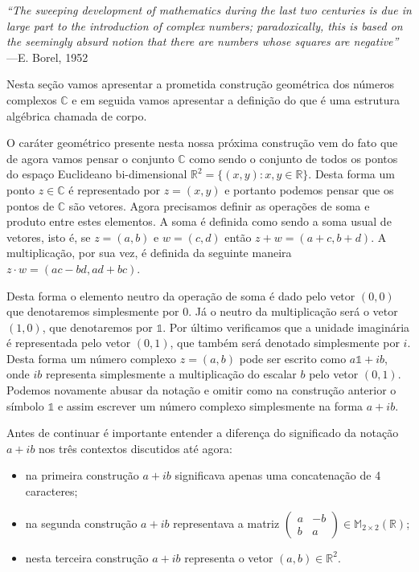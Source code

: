 \vspace{0.5cm}
\hfill%
\begin{minipage}{10cm}
\begin{flushright}
\rightskip=0.5cm
\textit{``The sweeping development of mathematics during the last two centuries is
due in large part to the introduction of complex numbers; paradoxically, this is based
on the seemingly absurd notion that there are numbers whose squares are negative''}
\\[0.1cm]
\rightskip=0.5cm
---E. Borel, 1952
\end{flushright}
\end{minipage}
\vspace{1cm}


Nesta seção vamos apresentar a prometida construção geométrica dos números complexos $\mathbb{C}$
e em seguida vamos apresentar a definição do que é uma estrutura algébrica chamada de corpo.

O caráter geométrico presente nesta nossa próxima construção vem do 
fato que de agora vamos pensar o conjunto $\mathbb{C}$ como sendo o conjunto de todos
os pontos do espaço Euclideano bi-dimensional $\mathbb{R}^2 = \{(x,y) : x,y\in \mathbb{R}\}$.
Desta forma um ponto $z\in\mathbb{C}$ é representado por $z=(x,y)$ e portanto podemos
pensar que os pontos de $\mathbb{C}$ são vetores. 
Agora precisamos definir as operações de soma e produto entre estes elementos. 
A soma é definida como sendo a soma usual de vetores, isto é, se $z=(a,b)$ e $w=(c,d)$
então $z+w=(a+c,b+d)$. A multiplicação, por sua vez, é definida da seguinte maneira 
$z\cdot w = (ac-bd,ad+bc)$. 

Desta forma o elemento neutro da operação de soma é dado pelo vetor 
$(0,0)$ que denotaremos simplesmente por $0$. 
Já o  neutro da multiplicação será o vetor $(1,0)$, que denotaremos por $\mathds{1}$. 
Por último verificamos que a unidade imaginária é representada pelo vetor $(0,1)$,
que também será denotado simplesmente por $i$. Desta forma um número complexo $z=(a,b)$ pode ser 
escrito como $a\mathds{1}+ib$, onde $ib$ representa simplesmente a multiplicação do escalar $b$
pelo vetor $(0,1)$. Podemos novamente abusar da notação e omitir como na construção anterior o 
símbolo $\mathds{1}$ e assim escrever um número complexo simplesmente na forma $a+ib$.

Antes de continuar é importante entender a diferença do significado da notação $a+ib$ nos 
três contextos discutidos até agora: 

\begin{itemize}
\item na primeira construção $a+ib$ significava apenas uma concatenação de 4 caracteres;

\item na segunda construção $a+ib$ representava a matriz 
$\begin{pmatrix}
a&-b\\
b&a
\end{pmatrix}
\in
\mathbb{M}_{2\times 2}(\mathbb{R})
$;

\item nesta terceira construção $a+ib$ representa o vetor $(a,b)\in \mathbb{R}^2$.
\end{itemize}

